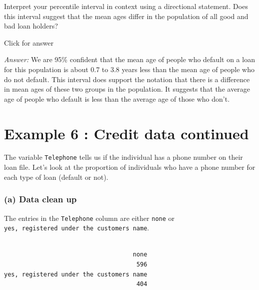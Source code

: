 \documentclass[
]{book}
\newenvironment{Shaded}{\begin{snugshade}}{\end{snugshade}}
\newcommand{\FunctionTok}[1]{\textcolor[rgb]{0.00,0.00,0.00}{#1}}
\newcommand{\NormalTok}[1]{#1}
\newcommand{\SpecialCharTok}[1]{\textcolor[rgb]{0.00,0.00,0.00}{#1}}
\begin{document}
Interpret your percentile interval in context using a directional statement. Does this interval suggest that the mean ages differ in the population of all good and bad loan holders?

Click for answer

\emph{Answer:} We are 95\% confident that the mean age of people who default on a loan for this population is about 0.7 to 3.8 years less than the mean age of people who do not default. This interval does support the notation that there is a difference in mean ages of these two groups in the population. It suggests that the average age of people who default is less than the average age of those who don't.

\hypertarget{example-6-credit-data-continued}{%
\section{Example 6 : Credit data continued}\label{example-6-credit-data-continued}}

The variable \texttt{Telephone} tells us if the individual has a phone number on their loan file. Let's look at the proportion of individuals who have a phone number for each type of loan (default or not).

\hypertarget{a-data-clean-up}{%
\subsubsection{(a) Data clean up}\label{a-data-clean-up}}

The entries in the \texttt{Telephone} column are either \texttt{none} or \texttt{yes,\ registered\ under\ the\ customers\ name}.

\begin{Shaded}
\end{Shaded}

\begin{verbatim}

                                    none 
                                     596 
yes, registered under the customers name 
                                     404 
\end{verbatim}
\end{document}
